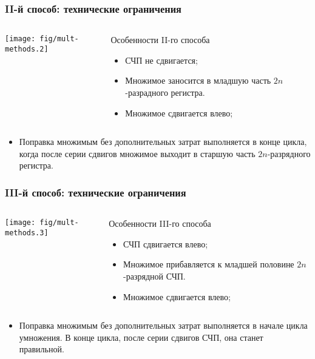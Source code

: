\begin{frame}
    \frametitle{II-й способ: технические ограничения}
    
    \begin{columns}
            \begin{block}{}
                \texttt{[image: fig/mult-methods.2]}
            \end{block}
            \begin{block}{Особенности II-го способа}
                \begin{itemize}
                    \item СЧП не сдвигается; 
                    \item Множимое заносится в младшую часть $2n$-разрадного регистра.
                    \item Множимое сдвигается влево;
                \end{itemize}
            \end{block}
    \end{columns}
    
    \begin{itemize}
        \item Поправка множимым без дополнительных затрат выполняется в конце цикла, когда после серии сдвигов множимое выходит в старшую часть $2n$-разрядного регистра.
    \end{itemize}
\end{frame}    

\begin{frame}
    \frametitle{III-й способ: технические ограничения}
    
    \begin{columns}
            \begin{block}{}
                \texttt{[image: fig/mult-methods.3]}
            \end{block}
            \begin{block}{Особенности III-го способа}
                \begin{itemize}
                    \item СЧП сдвигается влево; 
                    \item Множимое прибавляется к младшей половине $2n$-разрядной СЧП.
                    \item Множимое сдвигается влево;
                \end{itemize}
            \end{block}
    \end{columns}
    
    \begin{itemize}
        \item Поправка множимым без дополнительных затрат выполняется в начале цикла умножения. В конце цикла, после серии сдвигов СЧП, она станет правильной.
    \end{itemize}
\end{frame}    
    
